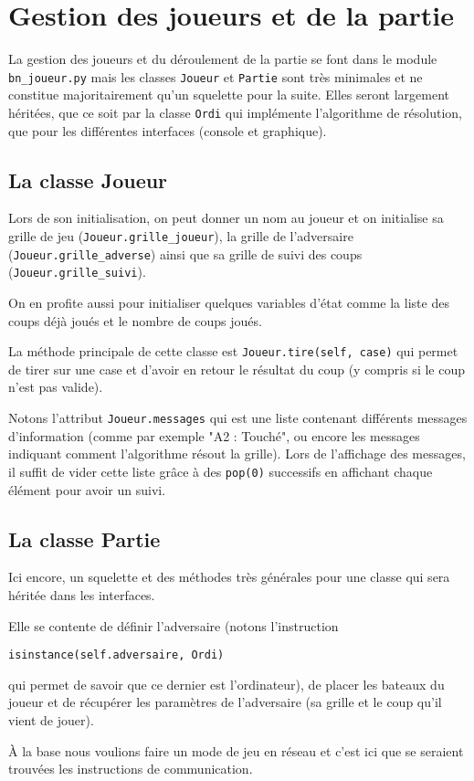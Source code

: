 \chapter{Gestion des joueurs et de la partie}

La gestion des joueurs et du déroulement de la partie se font dans le module \texttt{bn\_joueur.py} mais les classes \texttt{Joueur} et \texttt{Partie} sont très minimales et ne constitue majoritairement qu'un squelette pour la suite. Elles seront largement héritées, que ce soit par la classe \texttt{Ordi} qui implémente l'algorithme de résolution, que pour les différentes interfaces (console et graphique).

\section{La classe Joueur}
Lors de son initialisation, on peut donner un nom au joueur et on initialise sa grille de jeu (\texttt{Joueur.grille\_joueur}), la grille de l'adversaire (\texttt{Joueur.grille\_adverse}) ainsi que sa grille de suivi des coups (\texttt{Joueur.grille\_suivi}).

On en profite aussi pour initialiser quelques variables d'état comme la liste des coups déjà joués et le nombre de coups joués.

La méthode principale de cette classe est \texttt{Joueur.tire(self, case)} qui permet de tirer sur une case et d'avoir en retour le résultat du coup (y compris si le coup n'est pas valide).

Notons l'attribut \texttt{Joueur.messages} qui est une liste contenant différents messages d'information (comme par exemple "A2 : Touché", ou encore les messages indiquant comment l'algorithme résout la grille). Lors de l'affichage des messages, il suffit de vider cette liste grâce à des \texttt{pop(0)} successifs en affichant chaque élément pour avoir un suivi.

\section{La classe Partie}
Ici encore, un squelette et des méthodes très générales pour une classe qui sera héritée dans les interfaces.

Elle se contente de définir l'adversaire (notons l'instruction \begin{center}
\texttt{isinstance(self.adversaire, Ordi)}
\end{center} qui permet de savoir que ce dernier est l'ordinateur), de placer les bateaux du joueur et de récupérer les paramètres de l'adversaire (sa grille et le coup qu'il vient de jouer).

À la base nous voulions faire un mode de jeu en réseau et c'est ici que se seraient trouvées les instructions de communication.
